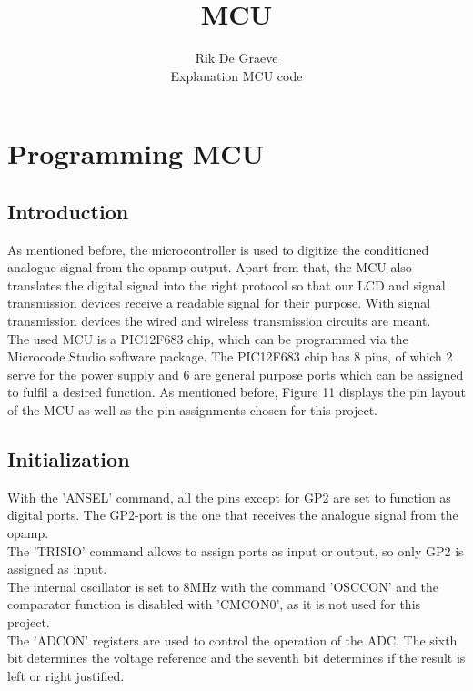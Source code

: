 \documentclass[12pt]{article}
\begin{document}
 
 
\title{ MCU }
\author{Rik De Graeve\\ %
Explanation MCU code}
\section{Programming MCU}
\subsection{Introduction}
As mentioned before, the microcontroller is used to digitize the conditioned analogue signal from the opamp output. Apart from that, the MCU also translates the digital signal into the right protocol so that our LCD and signal transmission devices receive a readable signal for their purpose. With signal transmission devices the wired and wireless transmission circuits are meant.\\

\noindent The used MCU is a PIC12F683 chip, which can be programmed via the Microcode Studio software package. The PIC12F683 chip has 8 pins, of which 2 serve for the power supply and 6 are general purpose ports which can be assigned to fulfil a desired function. As mentioned before, Figure 11 displays the pin layout of the MCU as well as the pin assignments chosen for this project.

\subsection{Initialization}

With the ’ANSEL’ command, all the pins except for GP2 are set to function as digital ports. The GP2-port is the one that receives the analogue signal from the opamp. \\

\noindent The ’TRISIO’ command allows to assign ports as input or output, so only GP2 is assigned as input. \\

\noindent The internal oscillator is set to 8MHz with the command ’OSCCON’ and the comparator function is disabled with ’CMCON0’, as it is not used for this project.\\

\noindent The ’ADCON’ registers are used to control the operation of the ADC. The sixth bit determines the voltage reference and the seventh bit determines if the result is left or right justified.\\
\end{document}
